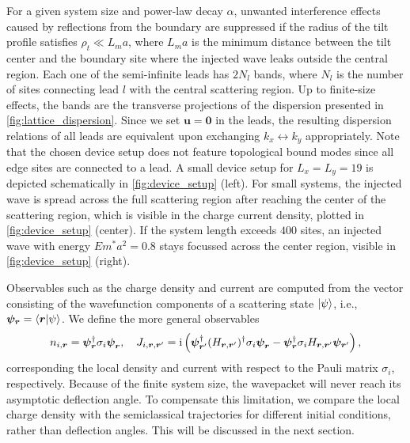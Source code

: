 \documentclass[submission, Phys]{SciPost}
\begin{document}
For a given system size and power-law decay $\alpha$, unwanted interference effects caused by reflections from the boundary are suppressed if the radius of the tilt profile satisfies $\rho_t\ll L_ma$, where $L_m a$ is the minimum distance between the tilt center and the boundary site where the injected wave leaks outside the central region.
Each one of the semi-infinite leads has $2N_l$ bands, where $N_l$ is the number of sites connecting lead $l$ with the central scattering region.
Up to finite-size effects, the bands are the transverse projections of the dispersion presented in \cref{fig:lattice_dispersion}.
Since we set $\bm{u}=\bm 0$ in the leads, the resulting dispersion relations of all leads are equivalent upon exchanging $k_x\leftrightarrow k_y$ appropriately.
Note that the chosen device setup does not feature topological bound modes since all edge sites are connected to a lead.
A small device setup for $L_x=L_y=19$ is depicted schematically in \cref{fig:device_setup} (left).
For small systems, the injected wave  is spread across the full scattering region after reaching the center of the scattering region, which is visible in the charge current density, plotted in \cref{fig:device_setup} (center).
If the system length exceeds $400$ sites, an injected wave with energy $Em^*a^2=0.8$ stays focussed across the center region, visible in \cref{fig:device_setup} (right).

Observables such as the charge density and current are computed from the vector consisting of the wavefunction components of a scattering state $\ket\psi$, i.e., $\bm \psi_{\bm r} = \braket{\bm r|\psi}$.
We define the more general observables
\begin{align}
    n_{i,\bm r} = \bm\psi^\dag_{\bm r}\sigma_{i}\bm\psi^\pdag_{\bm r}
    ,\quad
    J_{i,\bm r,\bm r'}=\ri\left(\bm\psi^\dag_{\bm r'}(H_{\bm r,\bm r'})^\dag\sigma_i\bm \psi_{\bm r\vphantom'} - \bm\psi^\dag_{\bm r}\sigma_i H_{\bm r,\bm r'}\bm\psi_{\bm r'}\right),
\end{align}
corresponding the local density and current with respect to the Pauli matrix $\sigma_i$, respectively.
Because of the finite system size, the wavepacket will never reach its asymptotic deflection angle.
To compensate this limitation, we compare the local charge density with the semiclassical trajectories for different initial conditions, rather than deflection angles.
This will be discussed in the next section.
\end{document}
